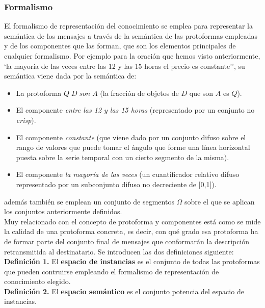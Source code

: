 \documentclass[10pt,a4paper]{article}
\begin{document}
\subsubsection{Formalismo}

El formalismo de representación del conocimiento se emplea para representar la semántica de los mensajes a través de la semántica de las protoformas empleadas y de los componentes que las forman, que son los elementos principales de cualquier formalismo. Por ejemplo para la oración que hemos visto anteriormente, `la mayoría de las veces entre las 12 y las 15 horas el precio es constante'', su semántica viene dada por la semántica de:

\begin{itemize}
\item La protoforma $Q \; D \; son \; A$ (la fracción de objetos de $D$ que son $A$ es $Q$).
\item El componente \textit{entre las 12 y las 15 horas} (representado por un conjunto no \textit{crisp}).
\item El componente \textit{constante} (que viene dado por un conjunto difuso sobre el rango de valores que puede tomar el ángulo que forme una línea horizontal puesta sobre la serie temporal con un cierto segmento de la misma).
\item El componente \textit{la mayoría de las veces} (un cuantificador relativo difuso representado por un subconjunto difuso no decreciente de [0,1]).
\end{itemize}

además también se emplean un conjunto de segmentos $\Omega$ sobre el que se aplican los conjuntos anteriormente definidos.\\

Muy relacionado con el concepto de protoforma y componentes está como se mide la calidad de una protoforma concreta, es decir, con qué grado esa protoforma ha de formar parte del conjunto final de mensajes que conformarán la descripción retransmitida al destinatario. Se introducen las dos definiciones siguiente:\\

\textbf{Definición 1.} El \textbf{espacio de instancias} es el conjunto de todas las protoformas que pueden contruirse empleando el formalismo de representación de conocimiento elegido.\\

\textbf{Definición 2.} El \textbf{espacio semántico} es el conjunto potencia del espacio de instancias.
\end{document}
